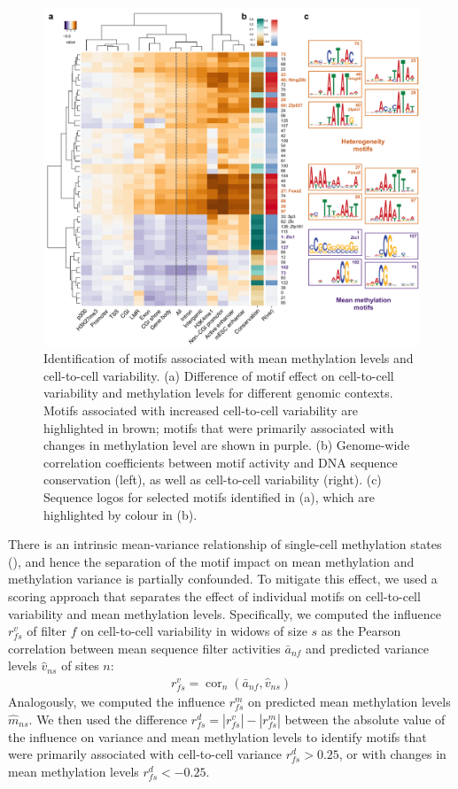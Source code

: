 \begin{figure}[htbp!]
\centering
\includegraphics[width=1.0\textwidth]{var_motifs}
\caption[Identification of motifs associated with mean methylation levels and cell-to-cell variability.]{Identification of motifs associated with mean methylation levels and cell-to-cell variability. (a) Difference of motif effect on cell-to-cell variability and methylation levels for different genomic contexts. Motifs associated with increased cell-to-cell variability are highlighted in brown; motifs that were primarily associated with changes in methylation level are shown in purple. (b) Genome-wide correlation coefficients between motif activity and DNA sequence conservation (left), as well as cell-to-cell variability (right). (c) Sequence logos for selected motifs identified in (a), which are highlighted by colour in (b).}
\label{fig:dcpg_var_motifs}
\end{figure}

There is an intrinsic mean-variance relationship of single-cell methylation states (), and hence the separation of the motif impact on mean methylation and methylation variance is partially confounded. To mitigate this effect, we used a scoring approach that separates the effect of individual motifs on cell-to-cell variability and mean methylation levels. Specifically, we computed the influence $r^v_{fs}$ of filter $f$ on cell-to-cell variability in widows of size $s$ as the Pearson correlation between mean sequence filter activities $\bar{a}_{nf}$ and predicted variance levels $\hat{v}_{ns}$ of sites $n$:
\begin{align}
  r^v_{fs}=\operatorname{cor}_n(\bar{a}_{nf},\hat{v}_{ns})
\end{align}
Analogously, we computed the influence $r^m_{fs}$ on predicted mean methylation levels $\hat{m}_{ns}$. We then used the difference $r^d_{fs}=|r^v_{fs}|-|r^m_{fs}|$ between the absolute value of the influence on variance and mean methylation levels to identify motifs that were primarily associated with cell-to-cell variance $r^d_{fs}>0.25$, or with changes in mean methylation levels $r^d_{fs}<-0.25$.

